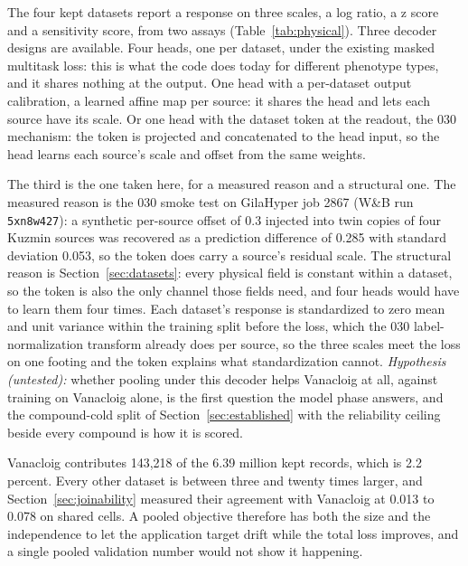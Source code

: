 The four kept datasets report a response on three scales, a log ratio, a z score and a
sensitivity score, from two assays (Table~\ref{tab:physical}). Three decoder designs are
available. Four heads, one per dataset, under the existing masked multitask loss: this is
what the code does today for different phenotype types, and it shares nothing at the output.
One head with a per-dataset output calibration, a learned affine map per source: it shares
the head and lets each source have its scale. Or one head with the dataset token at the
readout, the 030 mechanism: the token is projected and concatenated to the head input, so
the head learns each source's scale and offset from the same weights.

The third is the one taken here, for a measured reason and a structural one. The measured
reason is the 030 smoke test on GilaHyper job 2867 (W\&B run \texttt{5xn8w427}): a synthetic
per-source offset of 0.3 injected into twin copies of four Kuzmin sources was recovered as a
prediction difference of 0.285 with standard deviation 0.053, so the token does carry a
source's residual scale. The structural reason is Section~\ref{sec:datasets}: every physical
field is constant within a dataset, so the token is also the only channel those fields need,
and four heads would have to learn them four times. Each dataset's response is standardized
to zero mean and unit variance within the training split before the loss, which the 030
label-normalization transform already does per source, so the three scales meet the loss on
one footing and the token explains what standardization cannot. \textit{Hypothesis
(untested):} whether pooling under this decoder helps Vanacloig at all, against training on
Vanacloig alone, is the first question the model phase answers, and the compound-cold split
of Section~\ref{sec:established} with the reliability ceiling beside every compound is how it
is scored.

Vanacloig contributes 143{,}218 of the 6.39 million kept records, which is 2.2 percent. Every
other dataset is between three and twenty times larger, and Section~\ref{sec:joinability}
measured their agreement with Vanacloig at 0.013 to 0.078 on shared cells. A pooled objective
therefore has both the size and the independence to let the application target drift while the
total loss improves, and a single pooled validation number would not show it happening.

